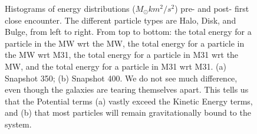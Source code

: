 \documentclass[linenumbers]{aastex631} %
\begin{document}
\begin{figure}[ht!]
\centering
      
      
\caption{\label{fig:potentialdists} Histograms of energy distributions ($M_\odot km^2/s^2$) pre- and post- first close encounter. The different particle types are Halo, Disk, and Bulge, from left to right. From top to bottom: the total energy for a particle in the MW wrt the MW, the total energy for a particle in the MW wrt M31, the total energy for a particle in M31 wrt the MW, and the total energy for a particle in M31 wrt M31. (a) Snapshot 350; (b) Snapshot 400. We do not see much difference, even though the galaxies are tearing themselves apart. This tells us that the Potential terms (a) vastly exceed the Kinetic Energy terms, and (b) that most particles will remain gravitationally bound to the system.}
\end{figure}
\end{document}
